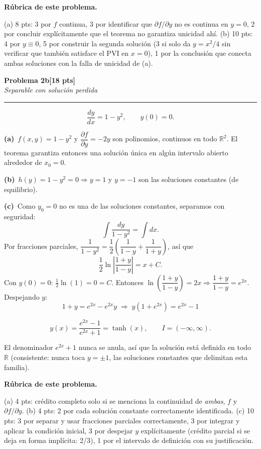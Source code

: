\documentclass[11pt,letterpaper]{article}
\newcommand{\problema}[3]{%
  \bigskip\noindent
  {\large\textbf{Problema #1}}\hfill\textbf{[#2 pts]}\\[3pt]
  {\small\itshape #3}\par
  \vspace{2pt}\hrule\vspace{8pt}
}
\newcommand{\subparte}[2]{%
  \medskip\noindent\textbf{(#1}\ #2\par\smallskip
}
\newenvironment{resultado}
  {\begin{mdframed}[linecolor=black,linewidth=0.6pt,
    innerleftmargin=6pt,innerrightmargin=6pt,innertopmargin=4pt,innerbottommargin=4pt]
   \bfseries}
  {\end{mdframed}}
\newenvironment{rubrica}{%
  \begin{mdframed}[linecolor=black,linewidth=0.6pt,
    innerleftmargin=8pt,innerrightmargin=8pt,innertopmargin=5pt,innerbottommargin=5pt]
  \small\textbf{Rúbrica de este problema.}\par\smallskip
}{\end{mdframed}}
\begin{document}
\begin{rubrica}
(a) 8 pts: 3 por $f$ continua, 3 por identificar que $\partial f/\partial y$ no es continua en $y=0$, 2 por concluir explícitamente que el teorema no garantiza unicidad ahí. (b) 10 pts: 4 por $y\equiv0$, 5 por construir la segunda solución (3 si solo da $y=x^2/4$ sin verificar que también satisface el PVI en $x=0$), 1 por la conclusión que conecta ambas soluciones con la falla de unicidad de (a).
\end{rubrica}

\problema{2b}{18}{Separable con solución perdida}

\[
\frac{dy}{dx}=1-y^2, \qquad y(0)=0.
\]

\subparte{a)}{$f(x,y)=1-y^2$ y $\dfrac{\partial f}{\partial y}=-2y$ son polinomios, continuos en todo $\mathbb{R}^2$. El teorema garantiza entonces una solución única en algún intervalo abierto alrededor de $x_0=0$.}

\subparte{b)}{$h(y)=1-y^2=0 \Rightarrow y=1$ y $y=-1$ son las soluciones constantes (de equilibrio).}

\subparte{c)}{Como $y_0=0$ no es una de las soluciones constantes, separamos con seguridad:
\[
\int \frac{dy}{1-y^2} = \int dx.
\]
Por fracciones parciales, $\dfrac{1}{1-y^2}=\dfrac12\left(\dfrac{1}{1-y}+\dfrac{1}{1+y}\right)$, así que
\[
\frac12\ln\left|\frac{1+y}{1-y}\right| = x+C.
\]
Con $y(0)=0$: $\frac12\ln(1)=0=C$. Entonces $\ln\!\left(\dfrac{1+y}{1-y}\right)=2x \Rightarrow \dfrac{1+y}{1-y}=e^{2x}$. Despejando $y$:
\[
1+y = e^{2x}-e^{2x}y \;\Rightarrow\; y(1+e^{2x}) = e^{2x}-1
\]
\begin{resultado}
\[
y(x) = \frac{e^{2x}-1}{e^{2x}+1} = \tanh(x), \qquad I = (-\infty,\infty).
\]
\end{resultado}
El denominador $e^{2x}+1$ nunca se anula, así que la solución está definida en todo $\mathbb R$ (consistente: nunca toca $y=\pm1$, las soluciones constantes que delimitan esta familia).}

\begin{rubrica}
(a) 4 pts: crédito completo solo si se menciona la continuidad de \emph{ambas}, $f$ y $\partial f/\partial y$. (b) 4 pts: 2 por cada solución constante correctamente identificada. (c) 10 pts: 3 por separar y usar fracciones parciales correctamente, 3 por integrar y aplicar la condición inicial, 3 por despejar $y$ explícitamente (crédito parcial si se deja en forma implícita: 2/3), 1 por el intervalo de definición con su justificación.
\end{rubrica}
\end{document}
